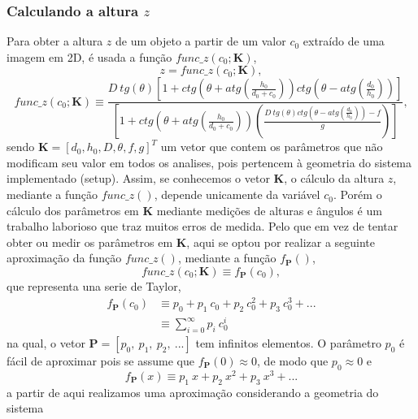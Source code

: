 \documentclass[a4paper, 12pt]{article}
\begin{document}
\subsubsection{Calculando a altura $z$}
Para obter a altura $z$ de um objeto a partir de um valor $c_0$ 
extraído de uma imagem em 2D, é usada a função
$func\_z(c_0;\mathbf{K})$, 
\begin{equation}
z = func\_z(c_0;\mathbf{K}),
\end{equation}
\begin{equation}\label{eq:setupz1}
func\_z(c_0;\mathbf{K})\equiv\frac{
D~tg(\theta)
\left[
1+ ctg\left(\theta+atg\left(\frac{h_0}{d_0+c_0}\right)\right) ctg\left(\theta-atg\left(\frac{d_0}{h_0}\right)\right) 
\right]
}{
\left[1+ctg\left(\theta+atg\left(\frac{h_0}{d_0+c_0}\right)\right) \left(\frac{D~tg(\theta)ctg\left(\theta-atg\left(\frac{d_0}{h_0}\right)\right)- f}{g}\right)\right]
},
\end{equation}
sendo $\mathbf{K}=[d_0,h_0,D,\theta,f,g]^T$
um vetor que contem os parâmetros que não modificam seu valor em todos os analises,
pois pertencem à geometria do sistema implementado (setup).
Assim, se conhecemos o vetor $\mathbf{K}$, o cálculo da altura $z$, mediante a função $func\_z()$,
depende unicamente da variável $c_0$.
Porém o cálculo dos parâmetros em $\mathbf{K}$ mediante medições de alturas e ângulos
é um trabalho laborioso que traz muitos erros de medida.
Pelo que em vez de tentar obter ou medir os parâmetros em $\mathbf{K}$,
aqui se optou por realizar a seguinte aproximação da função $func\_z()$, 
mediante a função $f_{\mathbf{P}}()$, 
\begin{equation}
func\_z(c_0;\mathbf{K})\equiv f_{\mathbf{P}}(c_0),
\end{equation}
que representa una serie de Taylor,
\begin{equation}
\begin{align*}
f_{\mathbf{P}}(c_0)  &\equiv p_0+p_1~c_0+p_2~c_0^2+p_3~c_0^3+...\\ 
 &\equiv \sum_{i=0}^{\infty}p_i~c_0^i
\end{align*}
\end{equation}
na qual, o vetor $\mathbf{P}=[p_0,~p_1,~p_2,~...]$ tem infinitos elementos. 
O parâmetro $p_0$ é fácil de aproximar pois se assume que $f_{\mathbf{P}}(0)\approx 0$,
de modo que $p_0\approx 0$ e 
\begin{equation}
f_{\mathbf{P}}(x)  \equiv p_1~x+p_2~x^2+p_3~x^3+...
\end{equation}
a partir de aqui realizamos uma aproximação considerando a geometria do sistema
\end{document}
